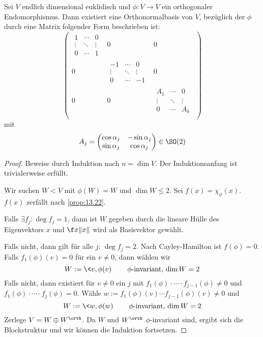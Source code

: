 \documentclass{mycourse}
\begin{document}
\begin{thm}
	\label{thm:13.23}
	Sei $V$ endlich dimensional euklidisch und $\phi : V\to V$ ein orthogonaler Endomorphismus.
	Dann existiert eine Orthonormalbasis von $V$, bezüglich der $\phi$ durch eine Matrix folgender Form beschrieben ist:
	\[
		\begin{pmatrix}
			\begin{matrix}1&\cdots&0\\\vdots&\ddots&\vdots\\0&\cdots&1\end{matrix} & 
												   0&0\\
						0&	  
			\begin{matrix}-1&\cdots&0\\\vdots&\ddots&\vdots\\0&\cdots&-1\end{matrix} &
			0\\
			0&	  
   0&					
  \begin{matrix}A_1&\cdots&0\\\vdots&\ddots&\vdots\\0&\cdots&A_k\end{matrix} \\
		\end{pmatrix}
	\]
	mit
	\[
		A_j = \begin{pmatrix}\cos \alpha_j & -\sin \alpha_j \\ \sin \alpha_j & \cos \alpha_j\end{pmatrix} \in \SO(2)
	\]
	\begin{proof}
		Beweise durch Induktion nach $n=\dim V$.
		Der Induktionsanfang ist trivialerweise erfüllt.

		Wir suchen $W < V$ mit $\phi(W) = W$ und $\dim W\le 2$.  
		Sei $f(x) = \chi_\phi(x)$.
		$f(x)$ zerfällt nach \ref{prop:13.22}.

		Falls $\exists f_j: \deg f_j = 1$, dann ist $W$ gegeben durch die lineare Hülle des Eigenvektors $x$ und $\f x{\|x\|}$ wird als Basisvektor gewählt.

		Falls nicht, dann gilt für alle $j$: $\deg f_j = 2$.
		Nach Cayley-Hamilton ist $f(\phi) = 0$.
		Falls $f_1(\phi)(v) = 0$ für ein $v\neq 0$, dann wählen wir
		\[
			W := \<v,\phi(v)\> \qquad \text{$\phi$-invariant, $\dim W =2$}
		\]
		Falls nicht, dann existiert für $v\neq 0$ ein $j$ mit $f_1(\phi)\cdot \dotsb \cdot f_{j-1}(\phi) \neq 0$ und $f_1(\phi)\cdot \dotsb \cdot f_j(\phi) = 0$.
		Wähle $w:= f_1(\phi)(v) \dotsb f_{j-1}(\phi)(v) \neq 0$ und
		\[
			W := \<w,\phi(w)\> \qquad \text{$\phi$-invariant, $\dim W = 2$}
		\]
		Zerlege $V = W \oplus W^\orth$.
		Da $W$ und $W^\orth$ $\phi$-invariant sind, ergibt sich die Blockstruktur und wir können die Induktion fortsetzen.

	\end{proof}
\end{thm}
\end{document}
